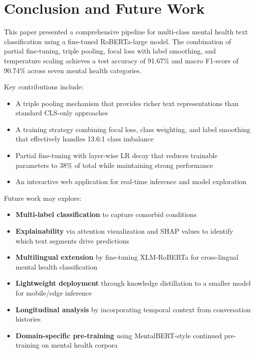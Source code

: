\documentclass[conference, 10pt]{IEEEtran}
\begin{document}
\section{Conclusion and Future Work}

This paper presented a comprehensive pipeline for multi-class mental health text classification using a fine-tuned RoBERTa-large model. The combination of partial fine-tuning, triple pooling, focal loss with label smoothing, and temperature scaling achieves a test accuracy of 91.67\% and macro F1-score of 90.74\% across seven mental health categories.

Key contributions include:
\begin{itemize}[noitemsep]
    \item A triple pooling mechanism that provides richer text representations than standard CLS-only approaches
    \item A training strategy combining focal loss, class weighting, and label smoothing that effectively handles 13.6:1 class imbalance
    \item Partial fine-tuning with layer-wise LR decay that reduces trainable parameters to 38\% of total while maintaining strong performance
    \item An interactive web application for real-time inference and model exploration
\end{itemize}

Future work may explore:
\begin{itemize}[noitemsep]
    \item \textbf{Multi-label classification} to capture comorbid conditions
    \item \textbf{Explainability} via attention visualization and SHAP values to identify which text segments drive predictions
    \item \textbf{Multilingual extension} by fine-tuning XLM-RoBERTa for cross-lingual mental health classification
    \item \textbf{Lightweight deployment} through knowledge distillation to a smaller model for mobile/edge inference
    \item \textbf{Longitudinal analysis} by incorporating temporal context from conversation histories
    \item \textbf{Domain-specific pre-training} using MentalBERT-style continued pre-training on mental health corpora
\end{itemize}
\end{document}

